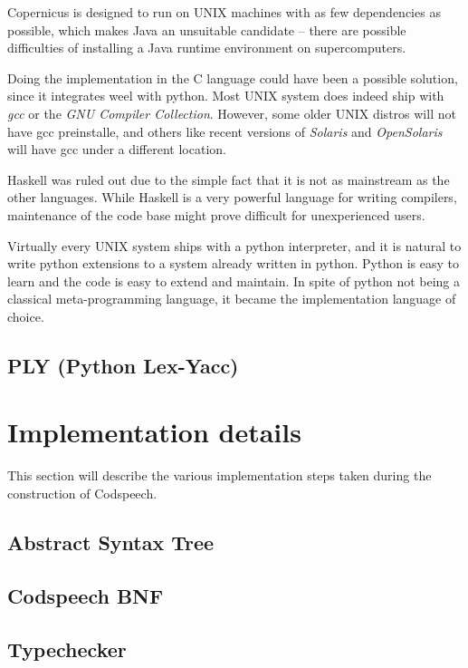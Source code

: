 Copernicus is designed to run on UNIX machines with as few
dependencies as possible, which makes Java an unsuitable candidate --
there are possible difficulties of installing a Java runtime
environment on supercomputers.

Doing the implementation in the C language could have been a possible
solution, since it integrates weel with python. Most UNIX system does
indeed ship with \emph{gcc} or the \emph{GNU Compiler
  Collection}. However, some older UNIX distros will not have gcc
preinstalle, and others like recent versions of \emph{Solaris} and
\emph{OpenSolaris} will have gcc under a different location.

Haskell was ruled out due to the simple fact that it is not as
mainstream as the other languages. While Haskell is a very powerful
language for writing compilers, maintenance of the code base might
prove difficult for unexperienced users.

Virtually every UNIX system ships with a python interpreter, and it is
natural to write python extensions to a system already written in
python. Python is easy to learn and the code is easy to extend and
maintain. In spite of python not being a classical meta-programming
language, it became the implementation language of choice.


\subsection{PLY (Python Lex-Yacc)}\label{sec:ply}



\section{Implementation details}
This section will describe the various implementation steps taken
during the construction of Codspeech.

\subsection{Abstract Syntax Tree}\label{sec:ast}


\subsection{Codspeech BNF}\label{sec:bnf}



\subsection{Typechecker}\label{sec:typechecker}


